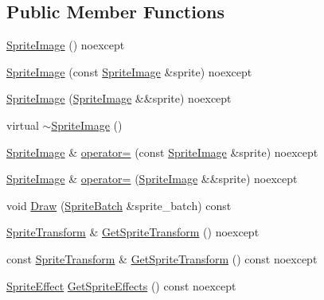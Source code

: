 \subsection*{Public Member Functions}
\begin{DoxyCompactItemize}
\item 
\mbox{\hyperlink{classmage_1_1rendering_1_1_sprite_image_af49f06e0de889dbfd2db264d9e07fc20}{Sprite\+Image}} () noexcept
\item 
\mbox{\hyperlink{classmage_1_1rendering_1_1_sprite_image_a788c62105830b6986a686c6f249c825d}{Sprite\+Image}} (const \mbox{\hyperlink{classmage_1_1rendering_1_1_sprite_image}{Sprite\+Image}} \&sprite) noexcept
\item 
\mbox{\hyperlink{classmage_1_1rendering_1_1_sprite_image_a267b1f56243e020f8cabef5d09c63cae}{Sprite\+Image}} (\mbox{\hyperlink{classmage_1_1rendering_1_1_sprite_image}{Sprite\+Image}} \&\&sprite) noexcept
\item 
virtual \mbox{\hyperlink{classmage_1_1rendering_1_1_sprite_image_a8723b0d72d07773eb4be1c059c7c1fb9}{$\sim$\+Sprite\+Image}} ()
\item 
\mbox{\hyperlink{classmage_1_1rendering_1_1_sprite_image}{Sprite\+Image}} \& \mbox{\hyperlink{classmage_1_1rendering_1_1_sprite_image_acf6e19eaf380ea76e4361778693facf2}{operator=}} (const \mbox{\hyperlink{classmage_1_1rendering_1_1_sprite_image}{Sprite\+Image}} \&sprite) noexcept
\item 
\mbox{\hyperlink{classmage_1_1rendering_1_1_sprite_image}{Sprite\+Image}} \& \mbox{\hyperlink{classmage_1_1rendering_1_1_sprite_image_adabb87110ec41d770061d375cb0db000}{operator=}} (\mbox{\hyperlink{classmage_1_1rendering_1_1_sprite_image}{Sprite\+Image}} \&\&sprite) noexcept
\item 
void \mbox{\hyperlink{classmage_1_1rendering_1_1_sprite_image_a0e4e572bae31d431f670895f98a7895e}{Draw}} (\mbox{\hyperlink{classmage_1_1rendering_1_1_sprite_batch}{Sprite\+Batch}} \&sprite\+\_\+batch) const
\item 
\mbox{\hyperlink{classmage_1_1_sprite_transform}{Sprite\+Transform}} \& \mbox{\hyperlink{classmage_1_1rendering_1_1_sprite_image_a1f4b344e6c2087c7b68b65a8d719e5ef}{Get\+Sprite\+Transform}} () noexcept
\item 
const \mbox{\hyperlink{classmage_1_1_sprite_transform}{Sprite\+Transform}} \& \mbox{\hyperlink{classmage_1_1rendering_1_1_sprite_image_a4d2fdf5ac9f60ef9bceb54055080a20b}{Get\+Sprite\+Transform}} () const noexcept
\item 
\mbox{\hyperlink{namespacemage_1_1rendering_a4dbc3536c87b906f1d41d863ec458e78}{Sprite\+Effect}} \mbox{\hyperlink{classmage_1_1rendering_1_1_sprite_image_a82a804fe9ed8c685268a1a42ab853eb4}{Get\+Sprite\+Effects}} () const noexcept

\end{DoxyCompactItemize}
